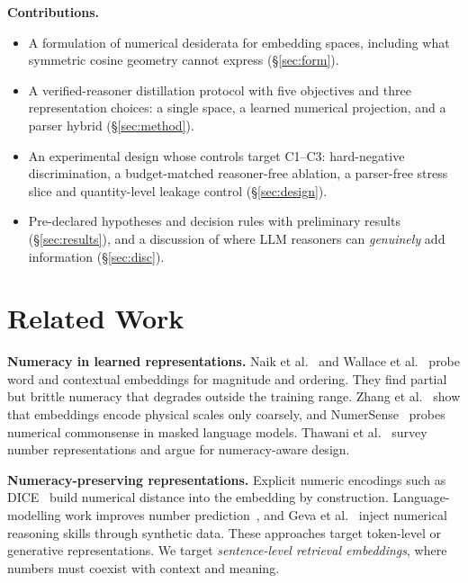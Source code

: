 \documentclass[conference]{IEEEtran}
\begin{document}
\textbf{Contributions.}
\begin{itemize}[leftmargin=*,itemsep=1pt,topsep=2pt]
\item A formulation of numerical desiderata for embedding spaces, including what symmetric cosine geometry cannot
express (\S\ref{sec:form}).
\item A verified-reasoner distillation protocol with five objectives and three representation choices: a single space,
a learned numerical projection, and a parser hybrid (\S\ref{sec:method}).
\item An experimental design whose controls target C1--C3: hard-negative discrimination, a budget-matched reasoner-free
ablation, a parser-free stress slice and quantity-level leakage control (\S\ref{sec:design}).
\item Pre-declared hypotheses and decision rules with preliminary results (\S\ref{sec:results}), and a discussion of
where LLM reasoners can \emph{genuinely} add information (\S\ref{sec:disc}).
\end{itemize}

\section{Related Work}
\textbf{Numeracy in learned representations.} Naik et al.~\cite{naik2019numeracy} and Wallace et
al.~\cite{wallace2019numbers} probe word and contextual embeddings for magnitude and ordering. They find partial but
brittle numeracy that degrades outside the training range. Zhang et al.~\cite{zhang2020scales} show that embeddings
encode physical scales only coarsely, and NumerSense~\cite{lin2020numersense} probes numerical commonsense in masked
language models. Thawani et al.~\cite{thawani2021survey} survey number representations and argue for numeracy-aware
design.

\textbf{Numeracy-preserving representations.} Explicit numeric encodings such as DICE~\cite{sundararaman2020dice}
build numerical distance into the embedding by construction. Language-modelling work improves number
prediction~\cite{spithourakis2018numeracy}, and Geva et al.~\cite{geva2020injecting} inject numerical reasoning skills
through synthetic data. These approaches target token-level or generative representations. We target
\emph{sentence-level retrieval embeddings}, where numbers must coexist with context and meaning.
\end{document}
